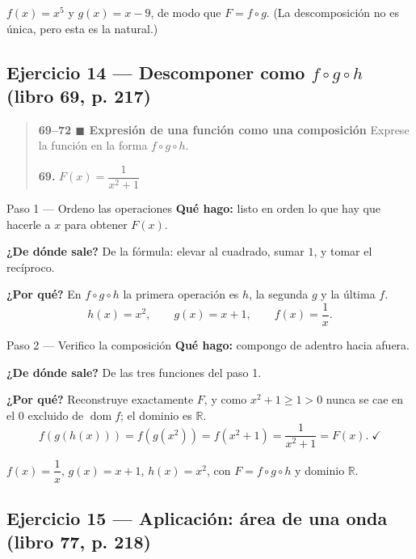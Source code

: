 \documentclass[11pt]{article}
\begin{document}
\begin{resp}
$f(x)=x^5$ y $g(x)=x-9$, de modo que $F=f\circ g$. (La descomposición no es única, pero esta es la natural.)
\end{resp}

\subsection*{Ejercicio 14 — Descomponer como $f\circ g\circ h$ (libro 69, p. 217)}

\begin{quote}
\textbf{69--72 $\blacksquare$ Expresión de una función como una composición} \quad Exprese la función en la forma $f\circ g\circ h$.

\textbf{69.} $F(x)=\dfrac{1}{x^2+1}$
\end{quote}

\begin{paso}{Paso 1 --- Ordeno las operaciones}
\textbf{Qué hago:} listo en orden lo que hay que hacerle a $x$ para obtener $F(x)$.

\textbf{¿De dónde sale?} De la fórmula: elevar al cuadrado, sumar $1$, y tomar el recíproco.

\textbf{¿Por qué?} En $f\circ g\circ h$ la primera operación es $h$, la segunda $g$ y la última $f$.
\[
h(x)=x^2,\qquad g(x)=x+1,\qquad f(x)=\frac{1}{x}.
\]
\end{paso}

\begin{paso}{Paso 2 --- Verifico la composición}
\textbf{Qué hago:} compongo de adentro hacia afuera.

\textbf{¿De dónde sale?} De las tres funciones del paso 1.

\textbf{¿Por qué?} Reconstruye exactamente $F$, y como $x^2+1\ge 1>0$ nunca se cae en el $0$ excluido de $\operatorname{dom} f$; el dominio es $\mathbb{R}$.
\[
f(g(h(x)))=f(g(x^2))=f(x^2+1)=\frac{1}{x^2+1}=F(x).\;\checkmark
\]
\end{paso}

\begin{resp}
$f(x)=\dfrac{1}{x}$, \; $g(x)=x+1$, \; $h(x)=x^2$, con $F=f\circ g\circ h$ y dominio $\mathbb{R}$.
\end{resp}

\subsection*{Ejercicio 15 — Aplicación: área de una onda (libro 77, p. 218)}
\end{document}
